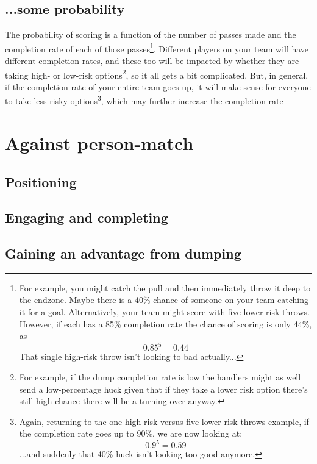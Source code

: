 \documentclass{tufte-handout}
\begin{document}
\subsection{...some probability}
\label{sec:probability}
The probability 
of scoring  
is a function of 
the number of passes made 
and the completion rate of 
each of those passes\footnote{
For example, 
you might catch the pull 
and then immediately 
throw it deep 
to the endzone.
Maybe there is a 
40\% chance 
of someone on your team 
catching it for a goal. 
Alternatively, 
your team might 
score with five 
lower-risk throws. 
However, if each has 
a 85\% completion rate
the chance of scoring is only 44\%, 
as 
\begin{equation} 0.85^5 = 0.44 \end{equation}
That single high-risk 
throw isn't looking to bad actually...}. 
Different players 
on your team 
will have 
different completion rates, 
and these too 
will be impacted by 
whether they are 
taking high- or low-risk 
options\footnote{
For example, if the 
dump completion 
rate is low the handlers 
might as well 
send a low-percentage huck 
given that if they take 
a lower risk option 
there's still high chance 
there will be
a turning over anyway.}, 
so it all gets a bit complicated.
But, 
in general, 
if the completion rate 
of your entire team goes up, 
it will 
make sense for everyone 
to take less risky options\footnote{
Again, returning to the one high-risk  
versus five lower-risk throws example, 
if the completion rate goes up 
to 90\%, we are now looking at: 
\begin{equation} 0.9^5 = 0.59 \end{equation}
...and suddenly that 40\% huck 
isn't looking too good anymore.
}, which may further 
increase the completion rate

\section{Against person-match}
\subsection{Positioning}
\label{sec:person-match_positioning}

\subsection{Engaging and completing}
\label{sec:person-match_engaging}

\subsection{Gaining an advantage from dumping}
\label{sec:person-match_advantage}
\end{document}
